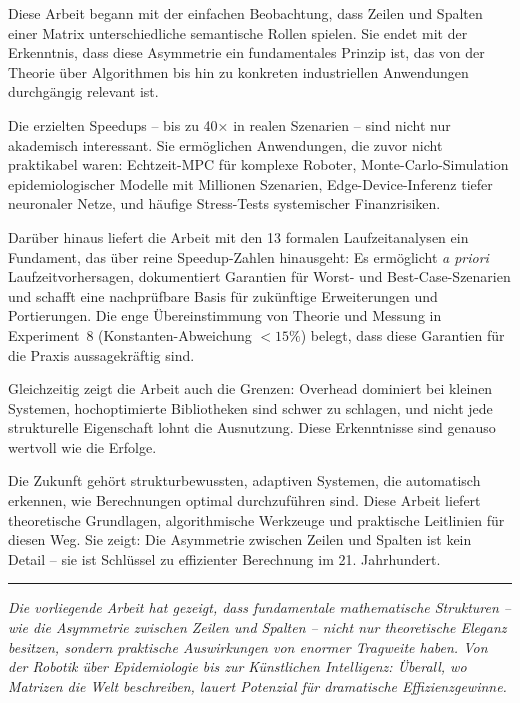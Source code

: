 \documentclass[a4paper,12pt]{report}
\theoremstyle{definition}
\begin{document}
	Diese Arbeit begann mit der einfachen Beobachtung, dass Zeilen und Spalten einer Matrix unterschiedliche semantische Rollen spielen. Sie endet mit der Erkenntnis, dass diese Asymmetrie ein fundamentales Prinzip ist, das von der Theorie über Algorithmen bis hin zu konkreten industriellen Anwendungen durchgängig relevant ist.
	
	Die erzielten Speedups – bis zu 40× in realen Szenarien – sind nicht nur akademisch interessant. Sie ermöglichen Anwendungen, die zuvor nicht praktikabel waren: Echtzeit-MPC für komplexe Roboter, Monte-Carlo-Simulation epidemiologischer Modelle mit Millionen Szenarien, Edge-Device-Inferenz tiefer neuronaler Netze, und häufige Stress-Tests systemischer Finanzrisiken.

	Darüber hinaus liefert die Arbeit mit den 13 formalen Laufzeitanalysen ein Fundament, das über reine Speedup-Zahlen hinausgeht: Es ermöglicht \emph{a priori} Laufzeitvorhersagen, dokumentiert Garantien für Worst- und Best-Case-Szenarien und schafft eine nachprüfbare Basis für zukünftige Erweiterungen und Portierungen. Die enge Übereinstimmung von Theorie und Messung in Experiment~8 (Konstanten-Abweichung $< 15\%$) belegt, dass diese Garantien für die Praxis aussagekräftig sind.
	
	Gleichzeitig zeigt die Arbeit auch die Grenzen: Overhead dominiert bei kleinen Systemen, hochoptimierte Bibliotheken sind schwer zu schlagen, und nicht jede strukturelle Eigenschaft lohnt die Ausnutzung. Diese Erkenntnisse sind genauso wertvoll wie die Erfolge.
	
	Die Zukunft gehört strukturbewussten, adaptiven Systemen, die automatisch erkennen, wie Berechnungen optimal durchzuführen sind. Diese Arbeit liefert theoretische Grundlagen, algorithmische Werkzeuge und praktische Leitlinien für diesen Weg. Sie zeigt: Die Asymmetrie zwischen Zeilen und Spalten ist kein Detail – sie ist Schlüssel zu effizienter Berechnung im 21. Jahrhundert.
	
	\vspace{1cm}
	
	\begin{center}
		\rule{0.5\textwidth}{0.4pt}
	\end{center}
	
	\vspace{0.5cm}
	
	\textit{Die vorliegende Arbeit hat gezeigt, dass fundamentale mathematische Strukturen – wie die Asymmetrie zwischen Zeilen und Spalten – nicht nur theoretische Eleganz besitzen, sondern praktische Auswirkungen von enormer Tragweite haben. Von der Robotik über Epidemiologie bis zur Künstlichen Intelligenz: Überall, wo Matrizen die Welt beschreiben, lauert Potenzial für dramatische Effizienzgewinne.}
\end{document}
